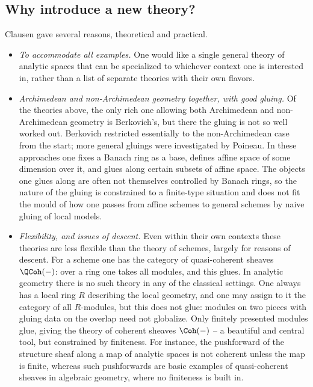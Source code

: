 \subsection{Why introduce a new theory?}

Clausen gave several reasons, theoretical and practical.

\begin{itemize}
\item \emph{To accommodate all examples.} One would like a single general theory
of analytic spaces that can be specialized to whichever context one is interested
in, rather than a list of separate theories with their own flavors.

\item \emph{Archimedean and non-Archimedean geometry together, with good
gluing.} Of the theories above, the only rich one allowing both Archimedean and
non-Archimedean geometry is Berkovich's, but there the gluing is not so well
worked out. Berkovich restricted essentially to the non-Archimedean case from the
start; more general gluings were investigated by Poineau. In these approaches one
fixes a Banach ring as a base, defines affine space of some dimension over it,
and glues along certain subsets of affine space. The objects one glues along are
often not themselves controlled by Banach rings, so the nature of the gluing is
constrained to a finite-type situation and does not fit the mould of how one
passes from affine schemes to general schemes by naive gluing of local models.

\item \emph{Flexibility, and issues of descent.} Even within their own contexts
these theories are less flexible than the theory of schemes, largely for reasons
of descent. For a scheme one has the category of quasi-coherent sheaves
$\QCoh(-)$: over a ring one takes all modules, and this glues. In analytic
geometry there is no such theory in any of the classical settings. One always has
a local ring $R$ describing the local geometry, and one may assign to it the
category of all $R$-modules, but this does not glue: modules on two pieces with
gluing data on the overlap need not globalize. Only finitely presented modules
glue, giving the theory of coherent sheaves $\Coh(-)$ -- a beautiful and
central tool, but constrained by finiteness. For instance, the pushforward of the
structure sheaf along a map of analytic spaces is not coherent unless the map is
finite, whereas such pushforwards are basic examples of quasi-coherent sheaves in
algebraic geometry, where no finiteness is built in.


\end{itemize}
